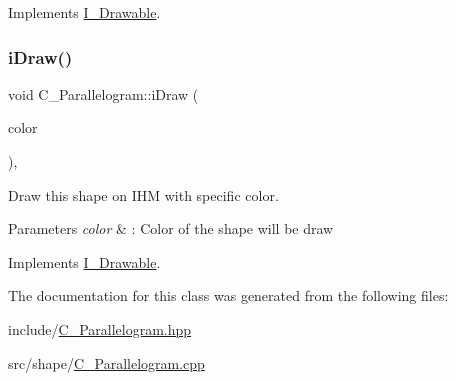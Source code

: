 Implements \hyperlink{classI__Drawable_a25f6474325614c451a91f019e5fe8010}{I\+\_\+\+Drawable}.

\mbox{\label{classC__Parallelogram_a044ce6d1042ea93589a38f4686489862}} 
\subsubsection{\texorpdfstring{i\+Draw()}{iDraw()}\hspace{0.1cm}{\footnotesize\ttfamily [4/4]}}
{\footnotesize\ttfamily void C\+\_\+\+Parallelogram\+::i\+Draw (\begin{DoxyParamCaption}\item[{M\+L\+V\+\_\+\+Color}]{color }\end{DoxyParamCaption})\hspace{0.3cm}{\ttfamily [override]}, {\ttfamily [virtual]}}



Draw this shape on I\+HM with specific color. 


\begin{DoxyParams}{Parameters}
{\em color} & \+: Color of the shape will be draw \\
\hline
\end{DoxyParams}


Implements \hyperlink{classI__Drawable_a25f6474325614c451a91f019e5fe8010}{I\+\_\+\+Drawable}.



The documentation for this class was generated from the following files\+:\begin{DoxyCompactItemize}
\item 
include/\hyperlink{C__Parallelogram_8hpp}{C\+\_\+\+Parallelogram.\+hpp}\item 
src/shape/\hyperlink{C__Parallelogram_8cpp}{C\+\_\+\+Parallelogram.\+cpp}\end{DoxyCompactItemize}
